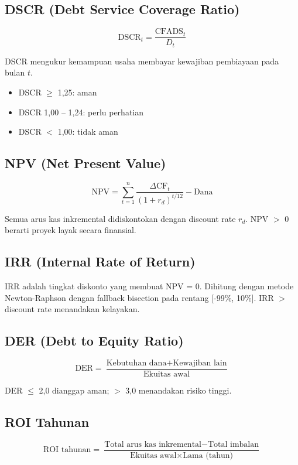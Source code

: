 \documentclass[12pt,a4paper,twoside]{report}
\begin{document}
\subsection{DSCR (Debt Service Coverage Ratio)}

\[
\text{DSCR}_t = \frac{\text{CFADS}_t}{D_t}
\]

DSCR mengukur kemampuan usaha membayar kewajiban pembiayaan pada bulan $t$.
\begin{itemize}
  \item DSCR $\ge$ 1,25: aman
  \item DSCR 1,00 -- 1,24: perlu perhatian
  \item DSCR $<$ 1,00: tidak aman
\end{itemize}

\subsection{NPV (Net Present Value)}

\[
\text{NPV} = \sum_{t=1}^{n} \frac{\Delta \text{CF}_t}{(1 + r_d)^{t/12}} - \text{Dana}
\]

Semua arus kas inkremental didiskontokan dengan discount rate $r_d$. NPV $>$ 0 berarti proyek layak secara finansial.

\subsection{IRR (Internal Rate of Return)}

IRR adalah tingkat diskonto yang membuat NPV = 0. Dihitung dengan metode Newton-Raphson dengan fallback bisection pada rentang $[$-99\%, 10\%$]$. IRR $>$ discount rate menandakan kelayakan.

\subsection{DER (Debt to Equity Ratio)}

\[
\text{DER} = \frac{\text{Kebutuhan dana} + \text{Kewajiban lain}}{\text{Ekuitas awal}}
\]

DER $\le$ 2,0 dianggap aman; $>$ 3,0 menandakan risiko tinggi.

\subsection{ROI Tahunan}

\[
\text{ROI tahunan} = \frac{\text{Total arus kas inkremental} - \text{Total imbalan}}{\text{Ekuitas awal} \times \text{Lama (tahun)}}
\]
\end{document}
